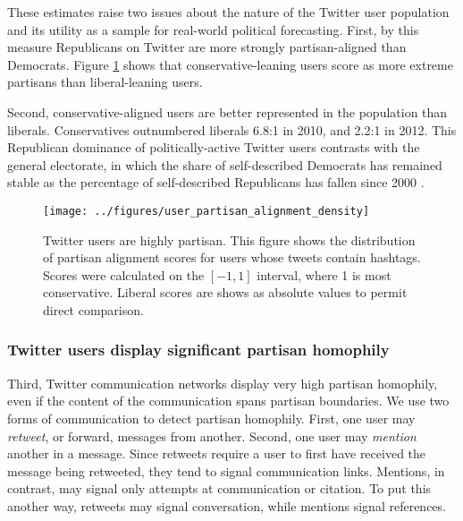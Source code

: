 \documentclass{article}
\begin{document}
These estimates raise two issues about the nature of the Twitter
user population and its utility as a sample for real-world political
forecasting. First, by this measure Republicans on Twitter are more
strongly partisan-aligned than Democrats. Figure
\ref{fig:user-pscore-distribution} shows that conservative-leaning
users score as more extreme partisans than liberal-leaning users.

Second, conservative-aligned users are better represented in the
population than liberals. Conservatives outnumbered liberals 6.8:1 in
2010, and 2.2:1 in 2012. This Republican dominance of
politically-active Twitter users contrasts with the general electorate,
in which the share of self-described Democrats has remained stable as
the percentage of self-described Republicans has fallen since 2000
\cite{pew2012}.



\begin{figure}[ht]
  \centering
  \texttt{[image: ../figures/user\_partisan\_alignment\_density]}
  \caption{Twitter users are highly partisan. This figure shows the distribution of partisan alignment
    scores for users whose tweets contain hashtags. Scores were
    calculated on the $[-1 , 1]$ interval, where 1 is most
    conservative. Liberal scores are shows as absolute values to permit direct comparison.}
  \label{fig:user-pscore-distribution}
\end{figure}




\subsubsection{Twitter users display significant partisan homophily}
\label{sec:twitt-users-displ}

Third, Twitter communication networks display very high partisan
homophily, even if the content of the communication spans partisan
boundaries. We use two forms of communication to detect partisan
homophily. First, one user may \textit{retweet}, or forward, messages
from another. Second, one user may \textit{mention} another in a
message. Since retweets require a user to first have received the
message being retweeted, they tend to signal communication
links. Mentions, in contrast, may signal only attempts at
communication or citation. To put this another way, retweets may
signal conversation, while mentions signal references.
\end{document}
